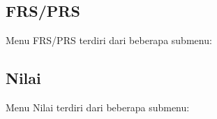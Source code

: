 \subsection{FRS/PRS}
    Menu FRS/PRS terdiri dari beberapa submenu:
	
\subsection{Nilai}
    Menu Nilai terdiri dari beberapa submenu:
    
